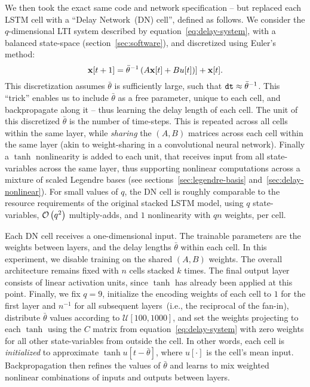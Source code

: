 We then took the exact same code and network specification -- but replaced each LSTM cell with a ``Delay Network~(DN) cell'', defined as follows.
We consider the $q$-dimensional LTI system described by equation~\ref{eq:delay-system}, with a balanced state-space (section~\ref{sec:software}), and discretized using Euler's method:
$$\mathbf{x}[t+1] =  \bar{\theta}^{-1} \left( A \mathbf{x}[t] + B u [t] \right)] + \mathbf{x}[t] \text{.}$$
This discretization assumes $\bar{\theta}$ is sufficiently large, such that $\texttt{dt}{} \approx \bar{\theta}^{-1}$.
This ``trick'' enables us to include $\bar{\theta}$ as a free parameter, unique to each cell, and backpropagate along it -- thus learning the delay length of each cell.
The unit of this discretized $\bar{\theta}$ is the number of time-steps.
This is repeated across all cells within the same layer, while \emph{sharing} the $(A, B)$ matrices across each cell within the same layer (akin to weight-sharing in a convolutional neural network).
Finally a $\tanh$ nonlinearity is added to each unit, that receives input from all state-variables across the same layer, thus supporting nonlinear computations across a mixture of scaled Legendre bases (see sections~\ref{sec:legendre-basis} and~\ref{sec:delay-nonlinear}).
For small values of $q$, the DN cell is roughly comparable to the resource requirements of the original stacked LSTM model, using $q$ state-variables, $\mathcal{O}\left({q^2}\right)$ multiply-adds, and $1$ nonlinearity with $qn$ weights, per cell.

Each DN cell receives a one-dimensional input. The trainable parameters are the weights between layers, and the delay lengths $\bar{\theta}$ within each cell.
In this experiment, we disable training on the shared $(A, B)$ weights.
The overall architecture remains fixed with $n$ cells stacked $k$ times.
The final output layer consists of linear activation units, since $\tanh$ has already been applied at this point.
Finally, we fix $q=9$, initialize the encoding weights of each cell to $1$ for the first layer and $n^{-1}$ for all subsequent layers~(i.e., the reciprocal of the fan-in), distribute $\bar{\theta}$ values according to $\mathcal{U}[100, 1000]$, and set the weights projecting to each $\tanh$ using the $C$ matrix from equation~\ref{eq:delay-system} with zero weights for all other state-variables from outside the cell.
In other words, each cell is \emph{initialized} to approximate $\tanh u[t - \bar{\theta}]$, where $u[\cdot]$ is the cell's mean input.
Backpropagation then refines the values of $\bar{\theta}$ and learns to mix weighted nonlinear combinations of inputs and outputs between layers.

